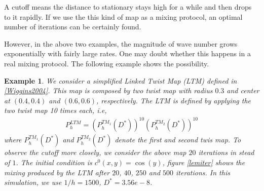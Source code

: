 \documentclass{article}
\newtheorem{example}{Example}
\begin{document}
A cutoff means the distance to stationary stays high for a while and then drops
to it rapidly. If we use the this kind of map as a mixing protocol, an optimal
number of iterations can be certainly found.

However, in the above two examples, the magnitude of wave number grows exponentially
with fairly large rates. One may doubt whether this happens in a real mixing protocol.
The following example shows the possibility.

\begin{example}
\label{LTM example}
We consider a simplified Linked Twist Map (LTM) defined in \ref{Wiggins2004}. This map
is composed by two twist map with radius $0.3$ and center at $(0.4,0.4)$ and $(0.6,0.6)$,
respectively. The LTM is defined by applying the two twist map 10 times each, i.e,
\begin{eqnarray}
 P^{LTM}_{h} = (P_{h}^{TM_1}(D^*))^{10}(P_{h}^{TM_2}(D^*))^{10}
\end{eqnarray}
where $P_{h}^{TM_1}(D^*)$ and $P_{h}^{TM_2}(D^*)$ denote the first and second twis map.
To observe the cutoff more closely, we consider the above map $20$ iterations in stead of $1$.
The initial condition is $c^0(x,y) = \cos(y)$, figure \ref{lemiter} shows the mixing produced by
the LTM after $20$, $40$, $250$ and $500$ iterations. In this simulation, we use $1/h = 1500$,
$D^* = 3.56e-8$.



\end{example}
\end{document}
